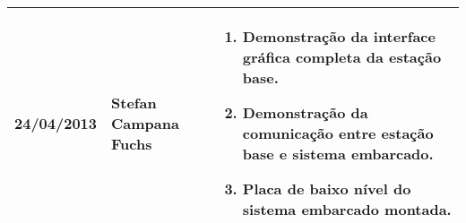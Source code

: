 \begin{table}[!h]
\begin{tabular}{p{3cm}|p{4cm}||p{7cm}}
%
    \hline
    24/04/2013 & Stefan Campana Fuchs & 
    \begin{enumerate}[topsep=0pt, partopsep=0pt, itemsep=0pt]
      \item Demonstração da interface gráfica completa da estação base.
      \item Demonstração da comunicação entre estação base e sistema embarcado.
      \item Placa de baixo nível do sistema embarcado montada.
    \end{enumerate}\\
    \bottomrule
    \end{tabular}%
  \label{tab:deliverables}%
\end{table}%
